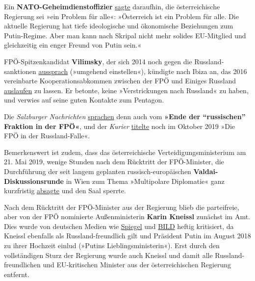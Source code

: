 Ein \textbf{NATO-Geheimdienstoffizier}
\href{https://www.buzzfeednews.com/article/mitchprothero/austria-russia-colonel-spy}{sagte}
daraufhin, die österreichische Regierung sei »ein Problem für alle«:
»Österreich ist ein Problem für alle. Die aktuelle Regierung hat tiefe
ideologische und ökonomische Beziehungen zum Putin-Regime. Aber man kann
nach Skripal nicht mehr solides EU-Mitglied und gleichzeitig ein enger
Freund von Putin sein.«

FPÖ-Spitzenkandidat \textbf{Vilimsky}, der sich 2014 noch gegen die
Russland­sanktionen
\href{https://www.fpoe.eu/vilimsky-strafsanktionen-gegen-russland-sind-verfassungswidrig-und-umgehend-einzustellen/}{aussprach}
(»umgehend einstellen«), kündigte nach Ibiza an, das 2016 vereinbarte
Koop­e­ra­tions­­abkommen zwischen der FPÖ und Einiges Russland
\href{https://www.oe24.at/oesterreich/politik/euwahl2019/Elefantenrunde-Ibiza-ist-fuer-Politik-tragisch/381787765}{auslaufen}
zu lassen. Er betonte, keine »Verstrickungen nach Russland« zu haben,
und verwies auf seine guten Kontakte zum Pentagon.

Die \emph{Salzburger Nachrichten}
\href{https://www.sn.at/politik/innenpolitik/das-ende-der-russischen-fraktion-in-der-fpoe-70471840}{sprachen}
denn auch vom \textbf{»Ende der ``russischen'' Fraktion in der FPÖ«},
und der \emph{Kurier}
\href{https://kurier.at/politik/inland/die-fpoe-in-der-russland-falle/400647842}{titelte}
noch im Oktober 2019 »Die FPÖ in der Russland-Falle«.

Bemerkenswert ist zudem, dass das österreichische
Verteidigungsministerium am 21. Mai 2019, wenige Stunden nach dem
Rücktritt der FPÖ-Minister, die Durchführung der seit langem geplanten
russisch-europäischen \textbf{Valdai-Diskussions­runde} in Wien zum
Thema »Multipolare Diplomatie« ganz kurzfristig
\href{https://www.nachdenkseiten.de/?p=51996}{absagte} und den Saal
sperrte.

Nach dem Rücktritt der FPÖ-Minister aus der Regierung blieb die
parteifreie, aber von der FPÖ nominierte Außenministerin \textbf{Karin
Kneissl} zunächst im Amt. Dies wurde von deutschen Medien wie
\href{https://www.spiegel.de/politik/ausland/oesterreich-aussenministerin-karin-kneissl-verweigert-ruecktritt-a-1268669.html}{Spiegel}
und
\href{https://www.bild.de/politik/ausland/politik-ausland/oesterreich-warum-darf-putins-lieblingsministerin-kneissl-bleiben-62076358.bild.html}{BILD}
heftig kritisiert, da Kneissl ebenfalls als Russland-freundlich gilt und
Präsident Putin im August 2018 zu ihrer Hochzeit einlud (»Putins
Lieblingsministerin«). Erst durch den vollständigen Sturz der Regierung
wurde auch Kneissl und damit alle Russland-freundlichen und
EU-kritischen Minister aus der österreichischen Regierung entfernt.

